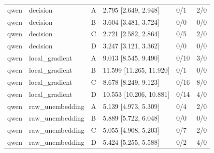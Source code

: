 \begin{tabular}{llllll}
qwen & decision & A & 2.795 [2.649, 2.948] & 0/1 & 2/0 \\
qwen & decision & B & 3.604 [3.481, 3.724] & 0/0 & 0/0 \\
qwen & decision & C & 2.721 [2.582, 2.864] & 0/5 & 2/0 \\
qwen & decision & D & 3.247 [3.121, 3.362] & 0/0 & 0/0 \\
qwen & local\_gradient & A & 9.013 [8.545, 9.490] & 0/10 & 3/0 \\
qwen & local\_gradient & B & 11.599 [11.265, 11.920] & 0/1 & 0/0 \\
qwen & local\_gradient & C & 8.678 [8.249, 9.123] & 0/16 & 8/0 \\
qwen & local\_gradient & D & 10.553 [10.206, 10.881] & 0/14 & 4/0 \\
qwen & raw\_unembedding & A & 5.139 [4.973, 5.309] & 0/4 & 2/0 \\
qwen & raw\_unembedding & B & 5.889 [5.722, 6.048] & 0/0 & 0/0 \\
qwen & raw\_unembedding & C & 5.055 [4.908, 5.203] & 0/7 & 2/0 \\
qwen & raw\_unembedding & D & 5.424 [5.255, 5.588] & 0/2 & 4/0 \\
\bottomrule
\end{tabular}
